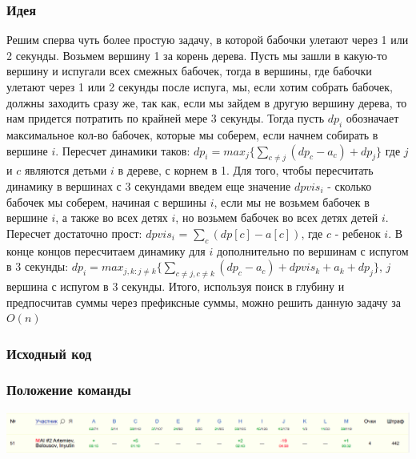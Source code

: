 \documentclass[12pt]{article}
\begin{document}
\subsubsection*{Идея}
Решим сперва чуть более простую задачу, в которой бабочки улетают через 1 или 2 секунды. Возьмем вершину 1 за корень дерева.
Пусть мы зашли в какую-то вершину и испугали всех смежных бабочек, тогда в вершины, где бабочки улетают через 1 или 2 секунды после испуга, мы, если хотим собрать бабочек, должны заходить сразу же, так как, если мы зайдем в другую вершину дерева, то нам придется потратить по крайней мере 3 секунды.
Тогда пусть $dp_i$ обозначает максимальное кол-во бабочек, которые мы соберем, если начнем собирать в вершине $i$. Пересчет динамики таков: $dp_i = max_{j}\{\sum_{c \neq j}(dp_c - a_c) + dp_j\}$ где $j$ и $c$ являются детьми $i$ в дереве, с корнем в 1.
Для того, чтобы пересчитать динамику в вершинах с 3 секундами введем еще значение $dpvis_i$ - сколько бабочек мы соберем, начиная с вершины $i$, если мы не возьмем бабочек в вершине $i$, а также во всех детях $i$, но возьмем бабочек во всех детях детей $i$. Пересчет достаточно прост: $dpvis_i$ = $\sum_{c}(dp[c] - a[c])$, где $c$ - ребенок $i$. В конце концов пересчитаем динамику для $i$ дополнительно по вершинам с испугом в 3 секунды: $dp_i = max_{j, k : j \neq k}\{\sum_{c \neq j, c \neq k}(dp_c - a_c) + dpvis_k + a_k + dp_j\}$, $j$ вершина с испугом в 3 секунды. Итого, используя поиск в глубину и предпосчитав суммы через префиксные суммы, можно решить данную задачу за $O(n)$
\subsubsection*{Исходный код}

\subsubsection*{Положение команды}
\includegraphics[scale=0.25]{images/gp_nanjing.png}\newline\noindent
\pagebreak


\end{document}
